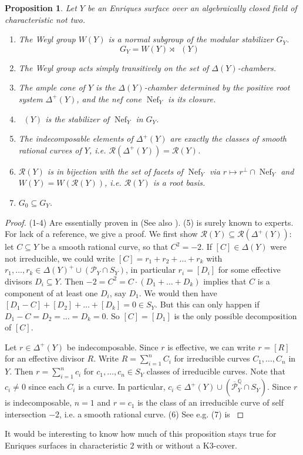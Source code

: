 \documentclass[a4paper]{amsart}
\theoremstyle{definition}
\theoremstyle{plain}
\newtheorem{proposition}[definition]{Proposition}
\DeclareMathOperator{\Nef}{Nef}
\DeclareMathOperator{\aut}{Aut^*}
\renewcommand{\P}{\mathcal{P}}
\newcommand{\R}{\mathcal{R}}
\newcommand{\Pbar}{\overline{\P}^\mathbb{Q}}
\begin{document}
\begin{proposition}\label{aut_and_weyl_group}\cite{dolgachev:OnAutomorphismsOfEnriquesSurfaces}\cite[Proposition 3.10]{brandhorst-gonzalez:527}
Let $Y$ be an Enriques surface over an algebraically closed field of characteristic not two.
\begin{enumerate}
\item The Weyl group $W(Y)$ is a normal subgroup of the modular stabilizer $G_Y$. 
\[G_Y = W(Y) \rtimes \aut(Y)\]
\item The Weyl group acts simply transitively on the set of $\Delta(Y)$-chambers.
\item The ample cone of $Y$ is the $\Delta(Y)$-chamber determined by the positive root system $\Delta^+(Y)$,
and the nef cone $\Nef_Y$ is its closure.
\item $\aut(Y)$ is the stabilizer of $\Nef_Y$ in $G_Y$.
\item The indecomposable elements of $\Delta^{+}(Y)$ are exactly the classes of smooth rational curves of $Y$, i.e. $\R(\Delta^{+}(Y))=\R(Y)$.
\item $\R(Y)$ is in bijection with the set of facets of $\Nef_Y$ via $r\mapsto r^\perp \cap \Nef_Y$ and $W(Y)=W(\R(Y))$, i.e. $\R(Y)$ is a root basis. 
\item $G_0 \subseteq G_Y$.
\end{enumerate}
\end{proposition}
\begin{proof}
(1-4) Are essentially proven in \cite[Proposition 3.2]{dolgachev:OnAutomorphismsOfEnriquesSurfaces} (See also \cite[Proposition 3.8]{brandhorst-gonzalez:527}).
(5) is surely known to experts. For lack of a reference, we give a proof. We first show $\R(Y)\subseteq\R(\Delta^{+}(Y))$: let $C\subseteq Y$ be a smooth rational curve, so that $C^2=-2$. 
If $[C]\in\Delta(Y)$ were not irreducible, we could write $[C]=r_1+r_2+\ldots+r_k$ with $r_1,\ldots,r_k\in \Delta(Y)^+\cup (\P_Y \cap S_Y)$, in particular $r_i=[D_i]$ for some effective divisors $D_i\subseteq Y$. 
Then $-2=C^2=C\cdot(D_1+\ldots+D_k)$ implies that $C$ is a component of at least one $D_i$, say $D_1$. We would then have $[D_1-C]+[D_2]+\ldots+[D_k]=0\in S_Y$. 
But this can only happen if $D_1-C=D_2=\ldots=D_k=0$. So $[C]=[D_1]$ is the only possible decomposition of $[C]$.

Let $r \in \Delta^+(Y)$ be indecomposable. 
Since $r$ is effective, we can write $r = [R]$ for an effective divisor $R$. Write $R = \sum_{i=1}^n C_i$ for irreducible curves $C_1,\dots, C_n$ in $Y$. Then $r=\sum_{i=1}^n c_i$ for $c_1,\dots, c_n \in S_Y$ classes of irreducible curves. Note that $c_i \neq 0$ since each $C_i$ is a curve.
In particular, $c_i \in \Delta^+(Y) \cup (\Pbar_Y \cap S_Y)$. 
Since $r$ is indecomposable, $n=1$ and $r = c_1$ is the class of an irreducible curve of self intersection $-2$, i.e. a smooth rational curve. 
(6) See e.g. \cite[Proposition 2.2.1, \S 0.8]{cdl:enriquesI}
(7) is \cite[Proposition 3.10]{brandhorst-gonzalez:527}
\end{proof}
It would be interesting to know how much of this proposition stays true for Enriques surfaces in characteristic $2$ with or without a K3-cover.\\
\end{document}
